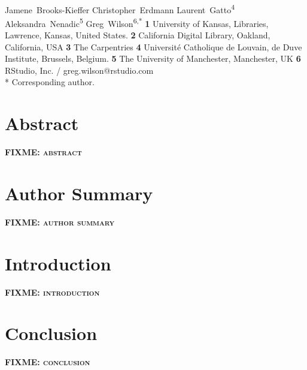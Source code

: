\documentclass[10pt,letterpaper]{article}
\newcommand{\fixme}[1]{\textsc{\textbf{FIXME: {#1}}}}
\begin{document}
\vspace*{0.2in}

\begin{flushleft}
{\Large
\textbf{}
}
\newline
\\
{Jamene~Brooks-Kieffer}
{Christopher~Erdmann}
{Laurent~Gatto}\textsuperscript{4}
{Aleksandra~Nenadic}\textsuperscript{5}
{Greg~Wilson}\textsuperscript{6,*}
\textbf{1} University of Kansas, Libraries, Lawrence, Kansas, United States.
\textbf{2} California Digital Library, Oakland, California, USA
\textbf{3} The Carpentries
\textbf{4} Université Catholique de Louvain, de Duve Institute, Brussels, Belgium.
\textbf{5} The University of Manchester, Manchester, UK
\textbf{6} RStudio, Inc. / greg.wilson@rstudio.com
\\
\bigskip
* Corresponding author.
\end{flushleft}

\section*{Abstract}

\fixme{abstract}

\section*{Author Summary}

\fixme{author summary}

\section*{Introduction}

\fixme{introduction}

\section*{Conclusion}

\fixme{conclusion}

\nocite{*} %

\end{document}
